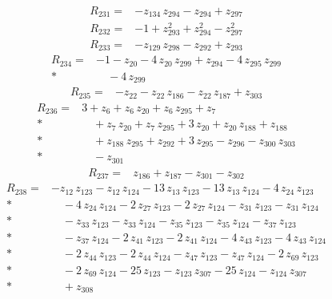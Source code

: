 \documentclass[10pt]{article}
\begin{document}
\begin{align*}
R_{231}={}& - z_{134}\,z_{294} - z_{294} + z_{297}
\end{align*}
\begin{align*}
R_{232}={}& - 1 + z_{293}^{2} + z_{294}^{2} - z_{297}^{2}
\end{align*}
\begin{align*}
R_{233}={}& - z_{129}\,z_{298} - z_{292} + z_{293}
\end{align*}
\begin{align*}
R_{234}={}& - 1 - z_{20} - 4\,z_{20}\,z_{299} + z_{294} - 4\,z_{295}\,z_{299} \\*
&\quad - 4\,z_{299}
\end{align*}
\begin{align*}
R_{235}={}& - z_{22} - z_{22}\,z_{186} - z_{22}\,z_{187} + z_{303}
\end{align*}
\begin{align*}
R_{236}={}& 3 + z_{6} + z_{6}\,z_{20} + z_{6}\,z_{295} + z_{7} \\*
&\quad + z_{7}\,z_{20} + z_{7}\,z_{295} + 3\,z_{20} + z_{20}\,z_{188} + z_{188} \\*
&\quad + z_{188}\,z_{295} + z_{292} + 3\,z_{295} - z_{296} - z_{300}\,z_{303} \\*
&\quad - z_{301}
\end{align*}
\begin{align*}
R_{237}={}& z_{186} + z_{187} - z_{301} - z_{302}
\end{align*}
\begin{align*}
R_{238}={}& - z_{12}\,z_{123} - z_{12}\,z_{124} - 13\,z_{13}\,z_{123} - 13\,z_{13}\,z_{124} - 4\,z_{24}\,z_{123} \\*
&\quad - 4\,z_{24}\,z_{124} - 2\,z_{27}\,z_{123} - 2\,z_{27}\,z_{124} - z_{31}\,z_{123} - z_{31}\,z_{124} \\*
&\quad - z_{33}\,z_{123} - z_{33}\,z_{124} - z_{35}\,z_{123} - z_{35}\,z_{124} - z_{37}\,z_{123} \\*
&\quad - z_{37}\,z_{124} - 2\,z_{41}\,z_{123} - 2\,z_{41}\,z_{124} - 4\,z_{43}\,z_{123} - 4\,z_{43}\,z_{124} \\*
&\quad - 2\,z_{44}\,z_{123} - 2\,z_{44}\,z_{124} - z_{47}\,z_{123} - z_{47}\,z_{124} - 2\,z_{69}\,z_{123} \\*
&\quad - 2\,z_{69}\,z_{124} - 25\,z_{123} - z_{123}\,z_{307} - 25\,z_{124} - z_{124}\,z_{307} \\*
&\quad + z_{308}
\end{align*}
\end{document}

